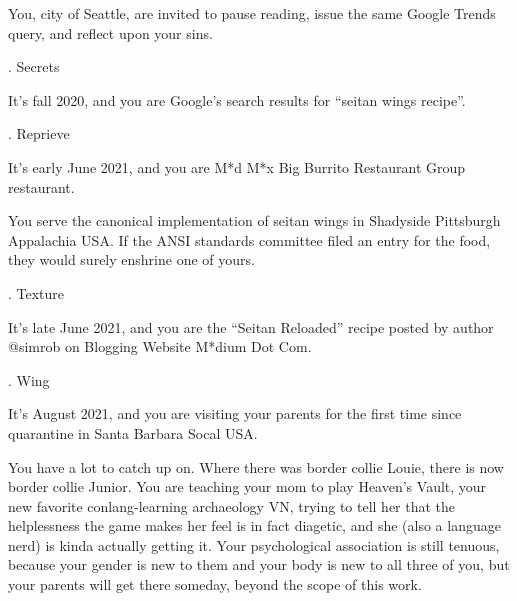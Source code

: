 \documentclass[12pt]{article}
\newcommand\chapter[2]{{\thispagestyle{empty} \Large \sc #1. \quad #2

\vspace{1.5em}}}
\begin{document}
You, city of Seattle, are invited to pause reading, issue the same Google Trends query, and reflect upon your sins.


\chapter{2}{Secrets}

It's fall 2020, and you are Google's search results for ``seitan wings recipe''.


\chapter{3}{Reprieve}

It's early June 2021, and you are M*d M*x Big Burrito Restaurant Group restaurant.

You serve the canonical implementation of seitan wings in Shadyside Pittsburgh Appalachia USA. If the ANSI standards committee filed an entry for the food, they would surely enshrine one of yours.


\chapter{4}{Texture}

It's late June 2021, and you are the ``Seitan Reloaded'' recipe posted by author {\sf @simrob} on Blogging Website M*dium Dot Com.


\newpage \thispagestyle{empty}

\chapter{5}{Wing}

It's August 2021, and you are visiting your parents for the first time since quarantine in Santa Barbara Socal USA.

You have a lot to catch up on.
Where there was border collie Louie, there is now border collie Junior.
You are teaching your mom to play Heaven's Vault,
your new favorite conlang-learning archaeology VN,
trying to tell her that the helplessness the game makes her feel is in fact diagetic,
and she (also a language nerd) is kinda actually getting it.
%
Your psychological association is still tenuous,
because your gender is new to them and your body is new to all three of you,
but your parents will get there someday, beyond the scope of this work.
\end{document}
